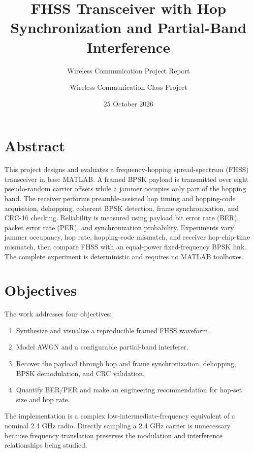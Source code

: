 \documentclass[
]{article}
\title{FHSS Transceiver with Hop Synchronization and Partial-Band
Interference}
\subtitle{Wireless Communication Project Report}
\author{Wireless Communication Class Project}
\date{25 October 2026}
\providecommand{\tightlist}{%
  \setlength{\itemsep}{0pt}\setlength{\parskip}{0pt}}
\begin{document}
\maketitle

{
\setcounter{tocdepth}{3}
\tableofcontents
}
\section{Abstract}\label{abstract}

This project designs and evaluates a frequency-hopping spread-spectrum
(FHSS) transceiver in base MATLAB. A framed BPSK payload is transmitted
over eight pseudo-random carrier offsets while a jammer occupies only
part of the hopping band. The receiver performs preamble-assisted hop
timing and hopping-code acquisition, dehopping, coherent BPSK detection,
frame synchronization, and CRC-16 checking. Reliability is measured
using payload bit error rate (BER), packet error rate (PER), and
synchronization probability. Experiments vary jammer occupancy, hop
rate, hopping-code mismatch, and receiver hop-chip-time mismatch, then
compare FHSS with an equal-power fixed-frequency BPSK link. The complete
experiment is deterministic and requires no MATLAB toolboxes.

\section{Objectives}\label{objectives}

The work addresses four objectives:

\begin{enumerate}
\def\labelenumi{\arabic{enumi}.}
\tightlist
\item
  Synthesize and visualize a reproducible framed FHSS waveform.
\item
  Model AWGN and a configurable partial-band interferer.
\item
  Recover the payload through hop and frame synchronization, dehopping,
  BPSK demodulation, and CRC validation.
\item
  Quantify BER/PER and make an engineering recommendation for hop-set
  size and hop rate.
\end{enumerate}

The implementation is a complex low-intermediate-frequency equivalent of
a nominal 2.4 GHz radio. Directly sampling a 2.4 GHz carrier is
unnecessary because frequency translation preserves the modulation and
interference relationships being studied.
\end{document}
